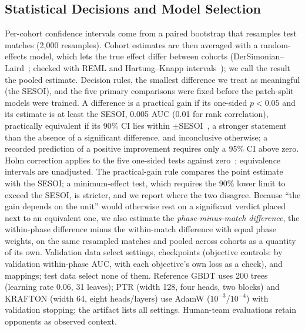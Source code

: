 \documentclass[sigconf,anonymous]{acmart}
\begin{document}
\subsection{Statistical Decisions and Model Selection}
Per-cohort confidence intervals come from a paired bootstrap that resamples test matches (2,000 resamples). Cohort estimates are then averaged with a random-effects model, which lets the true effect differ between cohorts (DerSimonian--Laird~\cite{DerSimonian86}; checked with REML and Hartung--Knapp intervals~\cite{HartungKnapp01}); we call the result the pooled estimate. Decision rules, the smallest difference we treat as meaningful (the SESOI), and the five primary comparisons were fixed before the patch-split models were trained. A difference is a practical gain if its one-sided $p<0.05$ and its estimate is at least the SESOI, 0.005 AUC (0.01 for rank correlation), practically equivalent if its 90\% CI lies within $\pm$SESOI~\cite{Schuirmann87}, a stronger statement than the absence of a significant difference, and inconclusive otherwise; a recorded prediction of a positive improvement requires only a 95\% CI above zero. Holm correction applies to the five one-sided tests against zero~\cite{Holm79}; equivalence intervals are unadjusted. The practical-gain rule compares the point estimate with the SESOI; a minimum-effect test, which requires the 90\% lower limit to exceed the SESOI, is stricter, and we report where the two disagree. Because ``the gain depends on the unit'' would otherwise rest on a significant verdict placed next to an equivalent one, we also estimate the \emph{phase-minus-match difference}, the within-phase difference minus the within-match difference with equal phase weights, on the same resampled matches and pooled across cohorts as a quantity of its own. Validation data select settings, checkpoints (objective controls: by validation within-phase AUC, with each objective's own loss as a check), and mappings; test data select none of them. Reference GBDT uses 200 trees (learning rate 0.06, 31 leaves); PTR (width 128, four heads, two blocks) and KRAFTON (width 64, eight heads/layers) use AdamW ($10^{-3}$/$10^{-4}$) with validation stopping; the artifact lists all settings. Human-team evaluations retain opponents as observed context.

\end{document}
